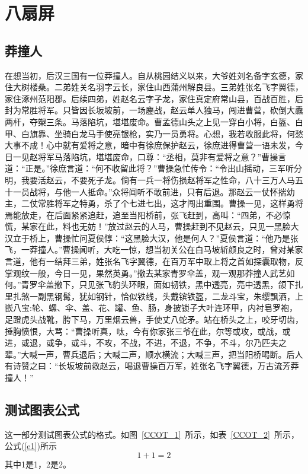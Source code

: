\chapter{八扇屏}

\section{莽撞人}

在想当初，后汉三国有一位莽撞人。自从桃园结义以来，大爷姓刘名备字玄德，家住大树楼桑。二弟姓关名羽字云长，家住山西蒲州解良县。三弟姓张名飞字翼德，家住涿州范阳郡。后续四弟，姓赵名云字子龙，家住真定府常山县，百战百胜，后封为常胜将军。只皆因长坂坡前，一场鏖战，赵云单人独马，闯进曹营，砍倒大纛两杆，夺槊三条。马落陷坑，堪堪废命。曹孟德山头之上见一穿白小将，白盔、白甲、白旗靠、坐骑白龙马手使亮银枪，实乃一员勇将。心想，我若收服此将，何愁大事不成！心中就有爱将之意，暗中有徐庶保护赵云，徐庶进得曹营一语未发，今日一见赵将军马落陷坑，堪堪废命，口尊：“丞相，莫非有爱将之意？”曹操言道：“正是。”徐庶言道：“何不收留此将？”曹操急忙传令：“令出山摇动，三军听分明，我要活赵云，不要死子龙。倘有一兵一将伤损赵将军之性命，八十三万人马五十一员战将，与他一人抵命。”众将闻听不敢前进，只有后退。那赵云一仗怀揣幼主，二仗常胜将军之特勇，杀了个七进七出，这才闯出重围。曹操一见，这样勇将焉能放走，在后面紧紧追赶，追至当阳桥前，张飞赶到，高叫：“四弟，不必惊慌，某家在此，料也无妨！”放过赵云的人马，曹操赶到不见赵云，只见一黑脸大汉立于桥上，曹操忙问夏侯惇：“这黑脸大汉，他是何人？”夏侯言道：“他乃是张飞，一莽撞人。”曹操闻听，大吃一惊，想当初关公在白马坡斩颜良之时，曾对某家言道，他有一结拜三弟，姓张名飞字翼德，在百万军中取上将之首如探囊取物，反掌观纹一般，今日一见，果然英勇。”撤去某家青罗伞盖，观一观那莽撞人武艺如何。”青罗伞盖撤下，只见张飞豹头环眼，面如韧铁，黑中透亮，亮中透黑，颌下扎里扎煞一副黑钢髯，犹如钢针，恰似铁线，头戴镔铁盔，二龙斗宝，朱缨飘洒，上嵌八宝:轮、螺、伞、盖、花、罐、鱼、肠，身披锁子大叶连环甲，内衬皂罗袍，足蹬虎头战靴，胯下马，万里烟云兽，手使丈八蛇矛。站在桥头之上，咬牙切齿，捶胸愤恨，大骂：“曹操听真，呔，今有你家张三爷在此，尔等或攻，或战，或进，或退，或争，或斗，不攻，不战，不进，不退，不争，不斗，尔乃匹夫之辈。”大喊一声，曹兵退后；大喊二声，顺水横流；大喊三声，把当阳桥喝断。后人有诗赞之曰：“长坂坡前救赵云，喝退曹操百万军，姓张名飞字翼德，万古流芳莽撞人！”

\section{测试图表公式}
这一部分测试图表公式的格式。如图~\ref{CCOT_1}~所示，如表~\ref{CCOT_2}~所示，公式(\ref{e1})所示
\begin{equation}
\label{e1}
    1+1=2
\end{equation}
其中1是1，2是2。


